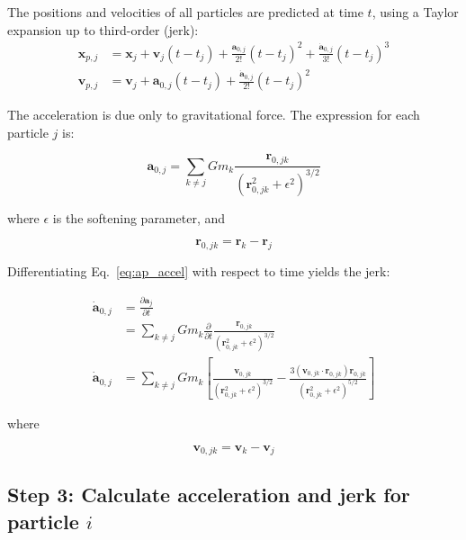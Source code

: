 \begin{appendixs}
	The positions and velocities of all particles are predicted at time $t$, using a Taylor expansion up to third-order (jerk):
	\begin{align}
		\mathbf{x}_{p, j} &= \mathbf{x}_j + \mathbf{v}_j (t - t_j) + \frac{\mathbf{a}_{0,j}}{2!} (t - t_j)^2 + \frac{\dot{\mathbf{a}}_{0,j}}{3!} (t - t_j)^3 \label{eq:ap_xpred} \\
		\mathbf{v}_{p, j} &= \mathbf{v}_j + \mathbf{a}_{0,j} (t - t_j) + \frac{\dot{\mathbf{a}}_{0,j}}{2!} (t - t_j)^2
	\end{align}
	
	The acceleration is due only to gravitational force. The expression for each particle $j$ is:
	
	\begin{equation}
		\mathbf{a}_{0, j} = \sum_{k \neq j} G m_k \frac{\mathbf{r}_{0,jk}}{(\mathbf{r}_{0,jk}^2 + \epsilon^2)^{3/2}} \label{eq:ap_accel}
	\end{equation}
	
	where $\epsilon$ is the softening parameter, and
	
	\begin{equation}
		\mathbf{r}_{0,jk} = \mathbf{r}_{k} - \mathbf{r}_{j}
	\end{equation}
	
	Differentiating Eq.~\eqref{eq:ap_accel} with respect to time yields the jerk:
	
	\begin{align}
		\dot{\mathbf{a}}_{0, j} &= \frac{\partial \mathbf{a}_j}{\partial t} \\
		&= \sum_{k \neq j} G m_k \frac{\partial}{\partial t}\frac{\mathbf{r}_{0,jk}}{(\mathbf{r}_{0,jk}^2 + \epsilon^2)^{3/2}} \\
		\dot{\mathbf{a}}_{0, j} &= \sum_{k \neq j} G m_k \left[\frac{\mathbf{v}_{0,jk}}{(\mathbf{r}_{0,jk}^2 + \epsilon^2)^{3/2}} - \frac{3(\mathbf{v}_{0,jk} \cdot \mathbf{r}_{0,jk})\mathbf{r}_{0,jk}}{(\mathbf{r}_{0,jk}^2 + \epsilon^2)^{5/2}}\right] \label{eq:ap_jerk}
	\end{align}
	
	where
	
	\begin{equation}
		\mathbf{v}_{0,jk} = \mathbf{v}_{k} - \mathbf{v}_{j}
	\end{equation}
	
	\subsection{Step 3: Calculate acceleration and jerk for particle $i$}
	

\end{appendixs}
